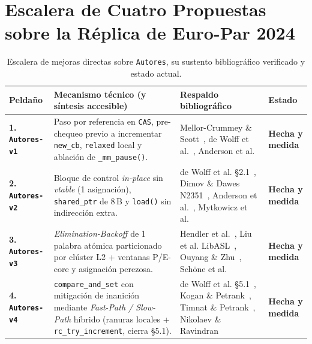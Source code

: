 \documentclass[11pt,a4paper]{article}
\begin{document}
\tableofcontents
\vspace{4pt}

\section{Escalera de Cuatro Propuestas sobre la Réplica de Euro-Par 2024}

\begin{table}[H]
\centering
\caption{Escalera de mejoras directas sobre \texttt{Autores}, su sustento bibliográfico verificado y estado actual.}
\label{tab:escalera}
\footnotesize
\begin{tabularx}{\linewidth}{@{}l >{\raggedright\arraybackslash}X >{\raggedright\arraybackslash}p{4.3cm} l@{}}
\toprule
\textbf{Peldaño} & \textbf{Mecanismo técnico (y síntesis accesible)} & \textbf{Respaldo bibliográfico} & \textbf{Estado} \\
\midrule
\textbf{1. \texttt{Autores-v1}} & Paso por referencia en \texttt{CAS}, pre-chequeo previo a incrementar \texttt{new\_cb}, \texttt{relaxed} local y ablación de \texttt{\_mm\_pause()}. & Mellor-Crummey \& Scott~\cite{mellorcrummey1991mcs}, de Wolff et al.~\cite{dewolff2024waitfree}, Anderson et al.~\cite{anderson2022turning} & \textcolor{ok}{\textbf{Hecha y medida}} \\
\textbf{2. \texttt{Autores-v2}} & Bloque de control \emph{in-place} sin \emph{vtable} (1 asignación), \texttt{shared\_ptr} de 8\,B y \texttt{load()} sin indirección extra. & de Wolff et al. \S 2.1~\cite{dewolff2024waitfree}, Dimov \& Dawes N2351~\cite{dimov2007n2351}, Anderson et al.~\cite{anderson2022turning}, Mytkowicz et al.~\cite{mytkowicz2009wrongdata} & \textcolor{ok}{\textbf{Hecha y medida}} \\
\textbf{3. \texttt{Autores-v3}} & \emph{Elimination-Backoff} de 1 palabra atómica particionado por clúster L2 + ventanas P/E-core y asignación perezosa. & Hendler et al.~\cite{hendler2004elimination}, Liu et al. LibASL~\cite{liu2022libasl}, Ouyang \& Zhu~\cite{ouyang2022coreaware}, Schöne et al.~\cite{schone2024alderlake} & \textcolor{ok}{\textbf{Hecha y medida}} \\
\textbf{4. \texttt{Autores-v4}} & \texttt{compare\_and\_set} con mitigación de inanición mediante \emph{Fast-Path / Slow-Path} híbrido (ranuras locales + \texttt{rc\_try\_increment}, cierra \S 5.1). & de Wolff et al. \S 5.1~\cite{dewolff2024waitfree}, Kogan \& Petrank~\cite{kogan2012methodology}, Timnat \& Petrank~\cite{timnat2014simulation}, Nikolaev \& Ravindran~\cite{nikolaev2024crystalline} & \textcolor{ok}{\textbf{Hecha y medida}} \\
\bottomrule
\end{tabularx}
\end{table}
\end{document}
